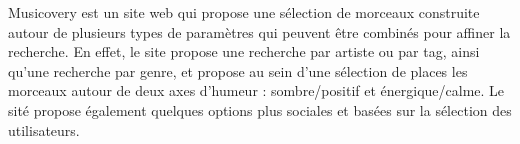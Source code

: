 Musicovery est un site web qui propose une sélection de morceaux construite autour de plusieurs types de paramètres qui peuvent être combinés pour affiner la recherche.
En effet, le site propose une recherche par artiste ou par tag, ainsi qu'une recherche par genre, et propose au sein d'une sélection de places les morceaux autour de deux axes d'humeur : sombre/positif et énergique/calme.
Le sité propose également quelques options plus sociales et basées sur la sélection des utilisateurs.
